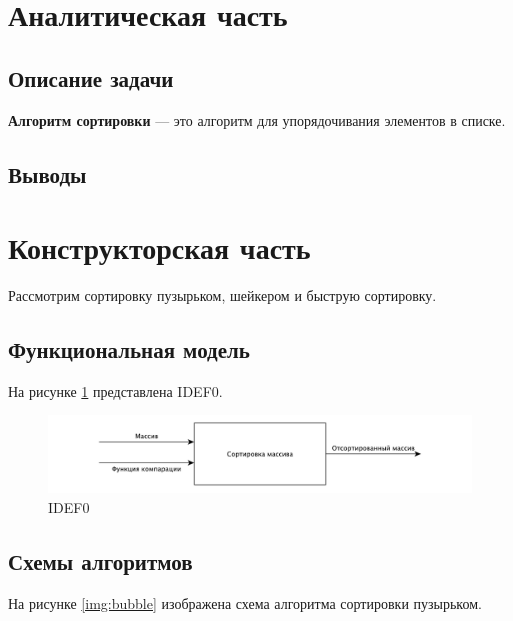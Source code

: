\documentclass[a4paper,12pt]{article}
\begin{document}
\newpage
\section{Аналитическая часть}


\subsection{Описание задачи}

\textbf{Алгоритм сортировки} — это алгоритм для упорядочивания элементов в списке. 

\subsection{Выводы}

\newpage
\section{Конструкторская часть}

Рассмотрим сортировку пузырьком, шейкером и быструю сортировку.

\subsection{Функциональная модель}

На рисунке \ref{img:IDEF0} представлена IDEF0.

\begin{figure}[H]
    \centering
    \includegraphics[scale=0.5]{IDEF0}
    \caption{IDEF0}
    \label{img:IDEF0}
\end{figure}

\subsection{Схемы алгоритмов}

На рисунке \ref{img:bubble} изображена схема алгоритма сортировки пузырьком.
\end{document}
